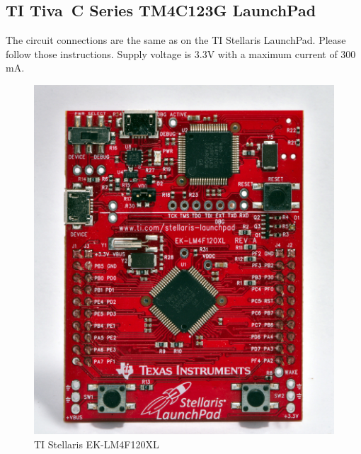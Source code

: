 \documentclass[twoside,11pt]{cergdoc}
\begin{document}
\subsection{TI Tiva\texttrademark~C Series TM4C123G LaunchPad}

The circuit connections are the same as on the TI Stellaris LaunchPad. Please follow
those instructions. Supply voltage is 3.3V with a maximum current of 300\,mA.

\begin{figure}[ht]
  \centering
  \begin{minipage}{.5\textwidth}
    \centering
    \includegraphics[scale=0.6]{figures/ek-lm4f120xl}
    \caption{TI Stellaris EK-LM4F120XL}\label{fig:stellaris}
  \end{minipage}%
  \begin{minipage}{.5\textwidth}
    \centering

\end{minipage}
\end{figure}
\end{document}
